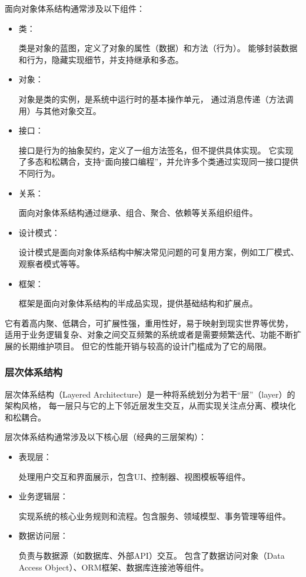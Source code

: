\documentclass[12pt]{ctexart} %
\begin{document}
面向对象体系结构通常涉及以下组件：
\begin{itemize}
  \item 类：

  类是对象的蓝图，定义了对象的属性（数据）和方法（行为）。
  能够封装数据和行为，隐藏实现细节，并支持继承和多态。
  \item 对象：
  
  对象是类的实例，是系统中运行时的基本操作单元，
  通过消息传递（方法调用）与其他对象交互。
  \item 接口：
  
  接口是行为的抽象契约，定义了一组方法签名，但不提供具体实现。
  它实现了多态和松耦合，支持“面向接口编程”，并允许多个类通过实现同一接口提供不同行为。
  \item 关系：
  
  面向对象体系结构通过继承、组合、聚合、依赖等关系组织组件。
  \item 设计模式：
  
  设计模式是面向对象体系结构中解决常见问题的可复用方案，例如工厂模式、观察者模式等等。
  \item 框架：
  
  框架是面向对象体系结构的半成品实现，提供基础结构和扩展点。
\end{itemize}

它有着高内聚、低耦合，可扩展性强，重用性好，易于映射到现实世界等优势，
适用于业务逻辑复杂、对象之间交互频繁的系统或者是需要频繁迭代、功能不断扩展的长期维护项目。
但它的性能开销与较高的设计门槛成为了它的局限。

\subsubsection{层次体系结构}
层次体系结构（Layered Architecture）是一种将系统划分为若干“层”（layer）的架构风格，
每一层只与它的上下邻近层发生交互，从而实现关注点分离、模块化和松耦合。

层次体系结构通常涉及以下核心层（经典的三层架构）：
\begin{itemize}
  \item 表现层：

  处理用户交互和界面展示，包含UI、控制器、视图模板等组件。
  \item 业务逻辑层：
  
  实现系统的核心业务规则和流程。包含服务、领域模型、事务管理等组件。
  \item 数据访问层：
  
  负责与数据源（如数据库、外部API）交互。
  包含了数据访问对象（Data Access Object）、ORM框架、数据库连接池等组件。
\end{itemize}
\end{document}
